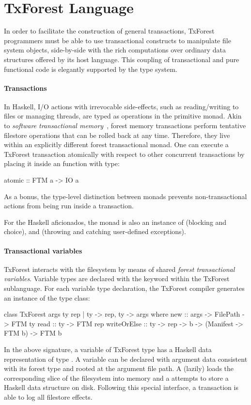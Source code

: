 
\section{TxForest Language}


In order to facilitate the construction of general transactions, TxForest programmers must be able to use transactional constructs to manipulate file system objects, side-by-side with the rich computations over ordinary data structures offered by its host language.
This coupling of transactional and pure functional code is elegantly supported by the type system.

\paragraph{Transactions}
In Haskell, I/O actions with irrevocable side-effects, such as reading/writing to files or managing threads, are typed as operations in the primitive  monad.
Akin to \emph{software transactional memory}~\cite{HaskellSTM}, forest memory transactions perform tentative filestore operations that can be rolled  back at any time. Therefore, they live within an explicitly different  forest transactional monad.
One can execute a TxForest transaction atomically with respect to other concurrent transactions by placing it inside an  function with type:
\begin{code}
atomic :: FTM a -> IO a
\end{code}
As a bonus, the type-level distinction between monads prevents non-transactional actions from being run inside a transaction.

For the Haskell aficionados, the  monad is also an instance of  (blocking and choice),  and  (throwing and catching user-defined exceptions).

\paragraph{Transactional variables}
TxForest interacts with the filesystem by means of shared \emph{forest transactional variables}. Variable types are declared with the  keyword within the TxForest sublanguage. For each variable type declaration, the TxForest compiler generates an instance of the  type class:
\begin{code}
class TxForest args ty rep | ty -> rep, ty -> args where
  new         :: args -> FilePath -> FTM ty
  read        :: ty -> FTM rep
  writeOrElse :: ty -> rep -> b
              -> (Manifest -> FTM b) -> FTM b
\end{code}
In the above signature, a variable of TxForest type  has a Haskell data representation of type . A  variable can be declared with argument data consistent with its forest type and rooted at the argument file path. A  (lazily) loads the corresponding slice of the filesystem into memory and a  attempts to store a Haskell data structure on disk.
Following this special interface, a transaction is able to log all filestore effects.

